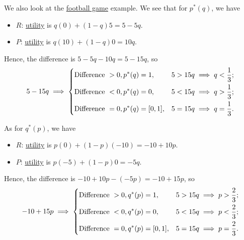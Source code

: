 \begin{eg}
	We also look at the \hyperref[eg:football]{football game} example. We see that for \(p^{\ast}(q)\), we have
	\begin{itemize}
		\item \(R\): \hyperref[def:reward]{utility} is \(q(0)+(1 - q)5 = 5 - 5q\).
		\item \(P\): \hyperref[def:reward]{utility} is \(q(10)+(1 - q)0 = 10q\).
	\end{itemize}
	Hence, the difference is \(5 - 5q-10q  = 5 - 15q\), so
	\[
		5 - 15q \implies \begin{dcases}
			\text{Difference }> 0, p^{\ast}(q) = 1,     & 5>15q \implies q<\frac{1}{3}; \\
			\text{Difference }< 0, p^{\ast}(q) = 0,     & 5<15q \implies q>\frac{1}{3}; \\
			\text{Difference }= 0, p^{\ast}(q) = [0,1], & 5=15q \implies q=\frac{1}{3}.
		\end{dcases}
	\]

	As for \(q^{\ast}(p)\), we have
	\begin{itemize}
		\item \(R\): \hyperref[def:reward]{utility} is \(p(0)+(1 - p)(-10)= -10 + 10p\).
		\item \(P\): \hyperref[def:reward]{utility} is \(p(-5)+(1 - p)0 = -5q\).
	\end{itemize}
	Hence, the difference is \(-10 + 10p - (-5p) = -10 + 15p\), so
	\[
		-10 +15p\implies \begin{dcases}
			\text{Difference }> 0, q^{\ast}(p) = 1,     & 5>15q \implies p>\frac{2}{3}; \\
			\text{Difference }< 0, q^{\ast}(p) = 0,     & 5<15q \implies p<\frac{2}{3}; \\
			\text{Difference }= 0, q^{\ast}(p) = [0,1], & 5=15q \implies p=\frac{2}{3}.
		\end{dcases}
	\]
	\begin{figure}[H]
		\centering
		\label{fig:NE-football}
	\end{figure}
\end{eg}

